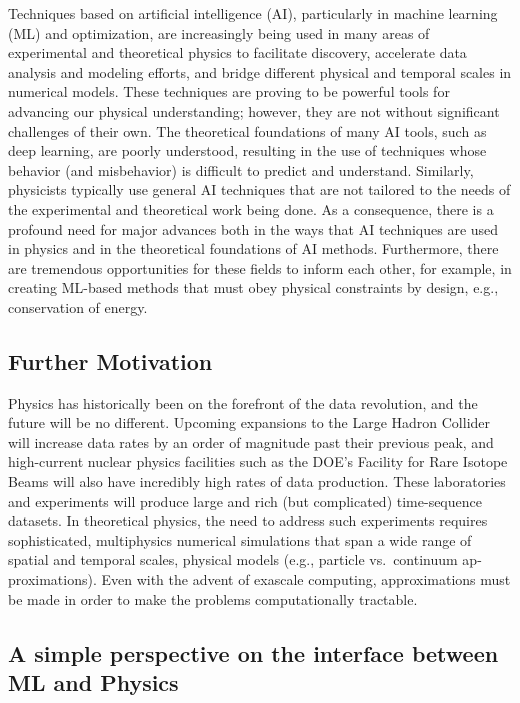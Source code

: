 \documentclass[%
oneside,                 %
final,                   %
10pt]{article}
\begin{document}
Techniques based on artificial intelligence (AI), particularly in
machine learning (ML) and optimization, are increasingly being used in
many areas of experimental and theoretical physics to facilitate
discovery, accelerate data analysis and modeling efforts, and bridge
different physical and temporal scales in numerical models. These 
techniques are proving to be powerful tools for advancing our physical
understanding; however, they are not without significant challenges
of their own. The theoretical foundations of many AI tools, such as
deep learning, are poorly understood, resulting in the use of
techniques whose behavior (and misbehavior) is difficult to predict
and understand. Similarly, physicists typically use general AI
techniques that are not tailored to the needs of the experimental and
theoretical work being done. As a consequence, there is a profound
need for major advances both in the ways that AI techniques are used
in physics and in the theoretical foundations of AI
methods. Furthermore, there are tremendous opportunities for these
fields to inform each other, for example, in creating ML-based
methods that must obey physical constraints by design, e.g.,
conservation of energy.


\subsection{Further Motivation}

Physics has historically been on the forefront of the data revolution,
and the future will be no different. Upcoming expansions to the
Large Hadron Collider will increase data rates by an order of
magnitude past their previous peak, and high-current nuclear physics
facilities such as the DOE’s Facility for Rare Isotope Beams will also
have incredibly high rates of data production. These laboratories and experiments
will produce large and rich (but
complicated) time-sequence datasets. In theoretical physics, the need
to address such experiments requires sophisticated, multiphysics
numerical simulations that span a wide range of spatial and temporal
scales, physical models (e.g., particle vs.~continuum ap-
proximations). Even with the advent of exascale
computing, approximations must be made in order to make the problems
computationally tractable.


\subsection{A simple perspective on the interface between ML and Physics}
\end{document}
